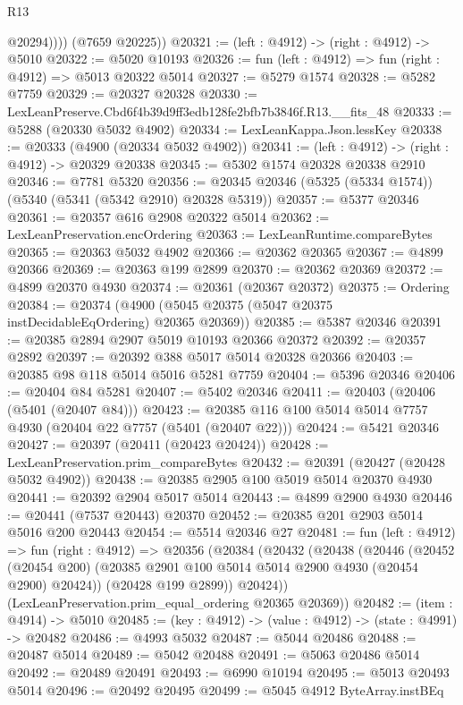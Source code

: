 \begin{lexlean}{R13}
\begin{coremodule}
              @20294))))
      (@7659 @20225))
@20321 := (left : @4912) -> (right : @4912) -> @5010
@20322 := @5020 @10193
@20326 := fun (left : @4912) => fun (right : @4912) => @5013 @20322 @5014
@20327 := @5279 @1574
@20328 := @5282 @7759
@20329 := @20327 @20328
@20330 := LexLeanPreserve.Cbd6f4b39d9ff3edb128fe2bfb7b3846f.R13.__fits_48
@20333 := @5288 (@20330 @5032 @4902)
@20334 := LexLeanKappa.Json.lessKey
@20338 := @20333 (@4900 (@20334 @5032 @4902))
@20341 := (left : @4912) -> (right : @4912) -> @20329 @20338
@20345 := @5302 @1574 @20328 @20338 @2910
@20346 := @7781 @5320
@20356 := @20345 @20346 (@5325 (@5334 @1574)) (@5340 (@5341 (@5342 @2910) @20328 @5319))
@20357 := @5377 @20346
@20361 := @20357 @616 @2908 @20322 @5014
@20362 := LexLeanPreservation.encOrdering
@20363 := LexLeanRuntime.compareBytes
@20365 := @20363 @5032 @4902
@20366 := @20362 @20365
@20367 := @4899 @20366
@20369 := @20363 @199 @2899
@20370 := @20362 @20369
@20372 := @4899 @20370 @4930
@20374 := @20361 (@20367 @20372)
@20375 := Ordering
@20384 := @20374 (@4900 (@5045 @20375 (@5047 @20375 instDecidableEqOrdering) @20365 @20369))
@20385 := @5387 @20346
@20391 := @20385 @2894 @2907 @5019 @10193 @20366 @20372
@20392 := @20357 @2892
@20397 := @20392 @388 @5017 @5014 @20328 @20366
@20403 := @20385 @98 @118 @5014 @5016 @5281 @7759
@20404 := @5396 @20346
@20406 := @20404 @84 @5281
@20407 := @5402 @20346
@20411 := @20403 (@20406 (@5401 (@20407 @84)))
@20423 := @20385 @116 @100 @5014 @5014 @7757 @4930 (@20404 @22 @7757 (@5401 (@20407 @22)))
@20424 := @5421 @20346
@20427 := @20397 (@20411 (@20423 @20424))
@20428 := LexLeanPreservation.prim_compareBytes
@20432 := @20391 (@20427 (@20428 @5032 @4902))
@20438 := @20385 @2905 @100 @5019 @5014 @20370 @4930
@20441 := @20392 @2904 @5017 @5014
@20443 := @4899 @2900 @4930
@20446 := @20441 (@7537 @20443) @20370
@20452 := @20385 @201 @2903 @5014 @5016 @200 @20443
@20454 := @5514 @20346 @27
@20481 := fun (left : @4912) =>
  fun (right : @4912) =>
  @20356
    (@20384
      (@20432
        (@20438
          (@20446
            (@20452 (@20454 @200) (@20385 @2901 @100 @5014 @5014 @2900 @4930 (@20454 @2900) @20424))
            (@20428 @199 @2899))
          @20424))
      (LexLeanPreservation.prim_equal_ordering @20365 @20369))
@20482 := (item : @4914) -> @5010
@20485 := (key : @4912) -> (value : @4912) -> (state : @4991) -> @20482
@20486 := @4993 @5032
@20487 := @5044 @20486
@20488 := @20487 @5014
@20489 := @5042 @20488
@20491 := @5063 @20486 @5014
@20492 := @20489 @20491
@20493 := @6990 @10194
@20495 := @5013 @20493 @5014
@20496 := @20492 @20495
@20499 := @5045 @4912 ByteArray.instBEq

\end{coremodule}
\end{lexlean}
